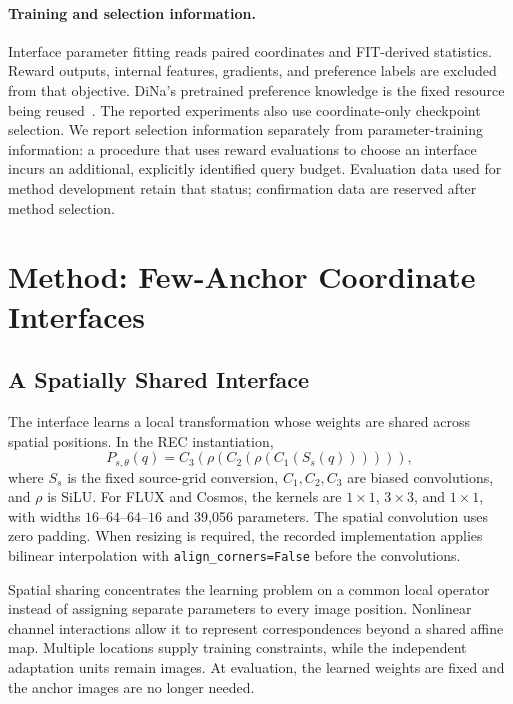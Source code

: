 \documentclass[10pt,twocolumn,letterpaper]{article}
\begin{document}
\paragraph{Training and selection information.}
Interface parameter fitting reads paired coordinates and FIT-derived statistics. Reward outputs, internal features, gradients, and preference labels are excluded from that objective. DiNa's pretrained preference knowledge is the fixed resource being reused~\cite{liu2026beyond}. The reported experiments also use coordinate-only checkpoint selection. We report selection information separately from parameter-training information: a procedure that uses reward evaluations to choose an interface incurs an additional, explicitly identified query budget. Evaluation data used for method development retain that status; confirmation data are reserved after method selection.

\section{Method: Few-Anchor Coordinate Interfaces}
\label{sec:method}
\subsection{A Spatially Shared Interface}
The interface learns a local transformation whose weights are shared across spatial positions. In the REC instantiation,
\begin{equation}
 P_{s,\theta}(q)=C_3\!\left(\rho\!\left(C_2\!\left(\rho(C_1(S_s(q)))\right)\right)\right),
 \label{eq:projector}
\end{equation}
where $S_s$ is the fixed source-grid conversion, $C_1,C_2,C_3$ are biased convolutions, and $\rho$ is SiLU. For FLUX and Cosmos, the kernels are $1\!\times\!1$, $3\!\times\!3$, and $1\!\times\!1$, with widths $16$--$64$--$64$--$16$ and 39,056 parameters. The spatial convolution uses zero padding. When resizing is required, the recorded implementation applies bilinear interpolation with \texttt{align\_corners=False} before the convolutions.

Spatial sharing concentrates the learning problem on a common local operator instead of assigning separate parameters to every image position. Nonlinear channel interactions allow it to represent correspondences beyond a shared affine map. Multiple locations supply training constraints, while the independent adaptation units remain images. At evaluation, the learned weights are fixed and the anchor images are no longer needed.
\end{document}

